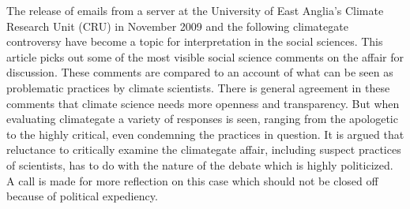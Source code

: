 The release of emails from a server at the University of East Anglia's Climate Research Unit (CRU) in November 2009 and the following climategate controversy have become a topic for interpretation in the social sciences. This article picks out some of the most visible social science comments on the affair for discussion. These comments are compared to an account of what can be seen as problematic practices by climate scientists. There is general agreement in these comments that climate science needs more openness and transparency. But when evaluating climategate a variety of responses is seen, ranging from the apologetic to the highly critical, even condemning the practices in question. It is argued that reluctance to critically examine the climategate affair, including suspect practices of scientists, has to do with the nature of the debate which is highly politicized. A call is made for more reflection on this case which should not be closed off because of political expediency.